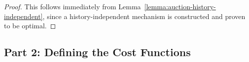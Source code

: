 \documentclass[11pt,letterpaper]{article}
\newcommand{\set}[1]{\left\{#1\right\}}
\newcommand{\sqbr}[1]{\left[ #1 \right]}
\newcommand{\brackets}[1]{\left( #1 \right)}
\DeclareMathOperator*{\E}{\bb{E}}
\DeclareMathOperator{\history}{\mathcal{H}}
\newcommand{\given}{\medspace | \medspace}
\newcommand{\bb}[1]{\mathbb{#1}}
\DeclareMathOperator{\A}{\auc{A}}
\DeclareMathOperator{\D}{\mathcal{D}}
\DeclareMathOperator{\M}{\mech{M}}
\newcommand{\g}{g}
\newcommand{\sumof}[3]{\sum_{{#1}={#2}}^{#3}\limits}
\theoremstyle{plain}
\newtheorem{claim}{Claim}
\newcommand{\auc}[1]{\mathsf{#1}}
\newcommand{\mech}[1]{\mathsf{#1}}
\begin{document}
\begin{proof}
     This follows immediately from Lemma~\ref{lemma:auction-history-independent}, since a history-independent mechanism is constructed and proven to be optimal.
\end{proof}

\subsection{Part 2: Defining the Cost Functions}%


\end{document}

